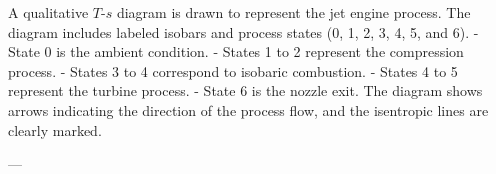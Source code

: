 A qualitative \( T \)-\( s \) diagram is drawn to represent the jet engine process. The diagram includes labeled isobars and process states (0, 1, 2, 3, 4, 5, and 6).  
- State 0 is the ambient condition.  
- States 1 to 2 represent the compression process.  
- States 3 to 4 correspond to isobaric combustion.  
- States 4 to 5 represent the turbine process.  
- State 6 is the nozzle exit.  
The diagram shows arrows indicating the direction of the process flow, and the isentropic lines are clearly marked.  

---